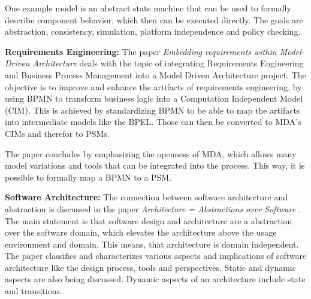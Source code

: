 One example model is an abstract state machine that can be used to formally describe component behavior, which then can be executed directly.
The goals are abstraction, consistency, simulation, platform independence and policy checking.

\textbf{Requirements Engineering:} The paper \textit{Embedding requirements within Model-Driven Architecture} \cite{jeary_embedding_2011} deals with the topic of integrating Requirements Engineering and Business Process Management into a Model Driven Architecture project.
The objective is to improve and enhance the artifacts of requirements engineering, by using \ac{BPMN} to transform business logic into a Computation Independent Model (CIM).
This is achieved by standardizing \ac{BPMN} to be able to map the artifacts into intermediate models like the \ac{BPEL}.
Those can then be converted to \ac{MDA}'s \acp{CIM} and therefor to \acp{PSM}.

The paper concludes by emphasizing the openness of \ac{MDA}, which allows many model variations and tools that can be integrated into the process.
This way, it is possible to formally map a \ac{BPMN} to a \ac{PSM}.

\textbf{Software Architecture:} The connection between software architecture and abstraction is discussed in the paper \textit{Architecture = Abstractions over Software} \cite{jacobsen_architectureabstractions_1999}.
The main statement is that software design and architecture are a abstraction over the software domain, which elevates the architecture above the usage environment and domain.
This means, that architecture is domain independent.
The paper classifies and characterizes various aspects and implications of software architecture like the design process, tools and perspectives.
Static and dynamic aspects are also being discussed.
Dynamic aspects of an architecture include state and transitions.












